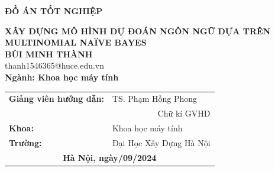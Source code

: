 \begin{titlepage}
\begin{center}
{\textbf{\huge{ĐỒ ÁN TỐT NGHIỆP}}}\\[0.5cm]
{\textbf{\Large{XÂY DỰNG MÔ HÌNH DỰ ĐOÁN NGÔN NGỮ DỰA TRÊN MULTINOMIAL NAÏVE BAYES}}\\[0.5cm]

{\textbf{\large{BÙI MINH THÀNH}}}\\
{\large{thanh1546365@huce.edu.vn}}\\[0.5cm]

{\textbf{\large{Ngành: Khoa học máy tính}}}\\

\vspace{1.5cm}

\begin{tabular}{ll}
\multicolumn{1}{c}{\textbf{Giảng viên hướng dẫn:}} & TS. Phạm Hồng Phong \hspace{0.5cm} \underline{\hspace{3cm}}  \\[0.5cm]
  & \multicolumn{1}{r}{Chữ kí GVHD}     \\[0.5cm]
\textbf{Khoa:}                                   & Khoa học máy tính                \\[0.5cm]
\textbf{Trường:}                                 & Đại Học Xây Dựng Hà Nội \\[2cm]
\multicolumn{2}{c}{\textbf{Hà Nội, ngày/09/2024}}                                            
\end{tabular}}

\end{center}

\end{titlepage}

